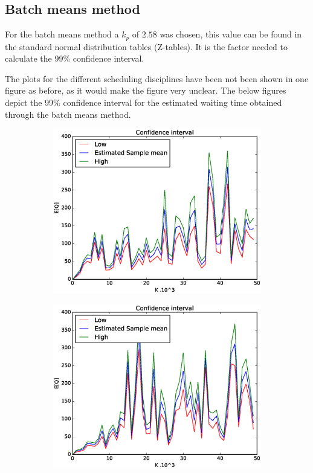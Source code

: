 \documentclass[a4paper]{article}
\begin{document}
\subsection{Batch means method}
For the batch means method a $k_{p}$ of $2.58$ was chosen, this value can be found in the standard normal distribution tables (Z-tables). It is the factor needed to calculate the 99\% confidence interval.

The plots for the different scheduling disciplines have been not been shown in one figure as before, as it would make the figure very unclear.
The below figures depict the 99\% confidence interval for the estimated waiting time obtained through the batch means method.
\begin{figure}[H]
\begin{subfigure}{.5\textwidth}
  \centering
  \includegraphics[width=\linewidth]{../figures/FCFS_batch_mean_ci}
  \label{fig:fcfsbm}
\end{subfigure}%
\begin{subfigure}{.5\textwidth}
  \centering
  \includegraphics[width=\linewidth]{../figures/LCFS_batch_mean_ci}
  \label{fig:lcfsbm}
\end{subfigure}
\end{figure}
\end{document}
